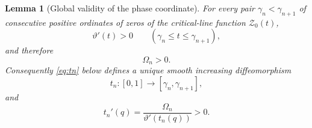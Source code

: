\documentclass[11pt]{amsart}
\numberwithin{equation}{section}
\newtheorem{lemma}[theorem]{Lemma}
\newcommand{\Zcal}{\mathcal Z}
\begin{document}
\begin{lemma}[Global validity of the phase coordinate]
\label{lem:phase-coordinate-validity}
For every pair $\gamma_n<\gamma_{n+1}$ of consecutive positive ordinates of zeros of the critical-line function $\Zcal_0(t)$,
\begin{equation}
\boxed{
\vartheta'(t)>0
\qquad
(\gamma_n\le t\le\gamma_{n+1}),
}
\label{eq:theta-prime-positive}
\end{equation}
and therefore
\begin{equation}
\boxed{\Omega_n>0.}
\label{eq:Omega-positive}
\end{equation}
Consequently \eqref{eq:tn} below defines a unique smooth increasing diffeomorphism
\[
t_n:[0,1]\longrightarrow[\gamma_n,\gamma_{n+1}],
\]
and
\begin{equation}
\boxed{
t_n'(q)=\frac{\Omega_n}{\vartheta'(t_n(q))}>0.
}
\label{eq:tnprime}
\end{equation}
\end{lemma}
\end{document}
